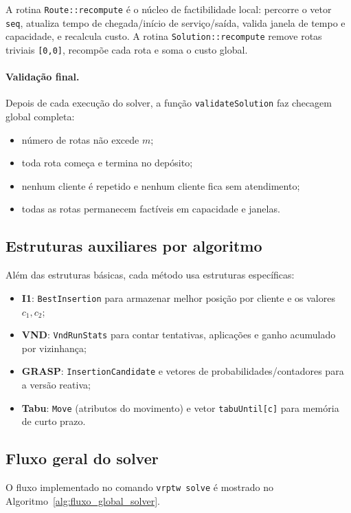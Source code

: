 A rotina \texttt{Route::recompute} é o núcleo de factibilidade local: percorre o vetor \texttt{seq}, atualiza tempo de chegada/início de serviço/saída, valida janela de tempo e capacidade, e recalcula custo.
A rotina \texttt{Solution::recompute} remove rotas triviais \texttt{[0,0]}, recompõe cada rota e soma o custo global.

\paragraph{Validação final.}
Depois de cada execução do solver, a função \texttt{validateSolution} faz checagem global completa:
\begin{itemize}
  \item número de rotas não excede $m$;
  \item toda rota começa e termina no depósito;
  \item nenhum cliente é repetido e nenhum cliente fica sem atendimento;
  \item todas as rotas permanecem factíveis em capacidade e janelas.
\end{itemize}

\subsection{Estruturas auxiliares por algoritmo}

Além das estruturas básicas, cada método usa estruturas específicas:
\begin{itemize}
  \item \textbf{I1}: \texttt{BestInsertion} para armazenar melhor posição por cliente e os valores $c_1,c_2$;
  \item \textbf{VND}: \texttt{VndRunStats} para contar tentativas, aplicações e ganho acumulado por vizinhança;
  \item \textbf{GRASP}: \texttt{InsertionCandidate} e vetores de probabilidades/contadores para a versão reativa;
  \item \textbf{Tabu}: \texttt{Move} (atributos do movimento) e vetor \texttt{tabuUntil[c]} para memória de curto prazo.
\end{itemize}

\subsection{Fluxo geral do solver}

O fluxo implementado no comando \texttt{vrptw solve} é mostrado no Algoritmo~\ref{alg:fluxo_global_solver}.

